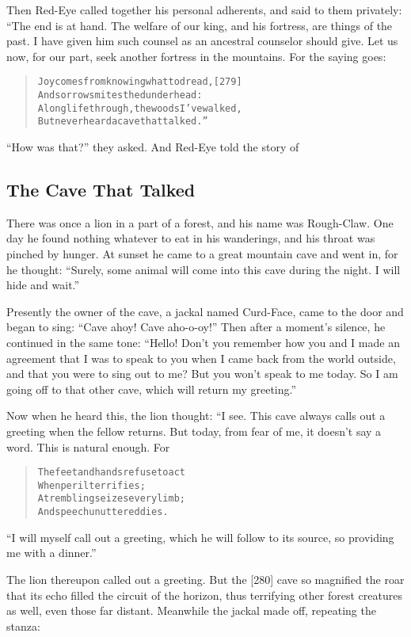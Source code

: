 \documentclass[article, twoside, 14pt]{memoir}
\renewenvironment{verbatim}{%
\begin{quote}%
\vskip -10pt%
\begin{alltt}\normalfont\large}{\end{alltt}%
\end{quote}%
\vskip -10pt
} %
\begin{document}
Then Red-Eye called together his personal adherents, and said to
them privately: “The end is at hand. The welfare of our king, and
his fortress, are things of the past. I have given him such counsel
as an ancestral counselor should give. Let us now, for our part,
seek another fortress in the mountains. For the saying goes:

\begin{verbatim}
Joy comes from knowing what to dread,                   [279]
And sorrow smites the dunderhead:
A long life through, the woods I've walked,
But never heard a cave that talked.”
\end{verbatim}
``How was that?'' they asked. And Red-Eye told the story of

\subsection{The Cave That Talked}

\label{s62}

There was once a lion in a part of a forest, and his name was
Rough-Claw. One day he found nothing whatever to eat in his
wanderings, and his throat was pinched by hunger. At sunset he came
to a great mountain cave and went in, for he thought:
``Surely, some animal will come into this cave during the night. I will hide and wait.''

Presently the owner of the cave, a jackal named Curd-Face, came to
the door and began to sing: ``Cave ahoy! Cave aho-o-oy!'' Then
after a moment's silence, he continued in the same tone:
``Hello! Don't you remember how you and I made an agreement that I was to speak to you when I came back from the world outside, and that you were to sing out to me? But you won't speak to me today. So I am going off to that other cave, which will return my greeting.''

Now when he heard this, the lion thought: “I see. This cave always
calls out a greeting when the fellow returns. But today, from fear
of me, it doesn't say a word. This is natural enough. For

\begin{verbatim}
The feet and hands refuse to act
    When peril terrifies;
A trembling seizes every limb;
    And speech unuttered dies.
\end{verbatim}
``I will myself call out a greeting, which he will follow to its source, so providing me with a dinner.''

The lion thereupon called out a greeting. But the [280] cave so
magnified the roar that its echo filled the circuit of the horizon,
thus terrifying other forest creatures as well, even those far
distant. Meanwhile the jackal made off, repeating the stanza:
\end{document}
